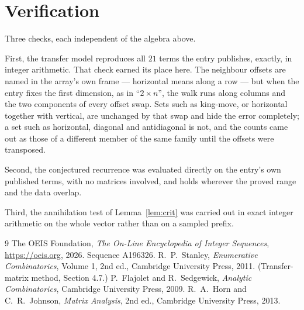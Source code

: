 \documentclass[11pt,a4paper]{article}
\theoremstyle{plain}
\theoremstyle{definition}
\begin{document}
\section{Verification}

Three checks, each independent of the algebra above.

First, the transfer model reproduces all $21$ terms the entry publishes, exactly, in
integer arithmetic. That check earned its place here. The neighbour offsets are named in the
array's own frame --- horizontal means along a row --- but when the entry fixes the first
dimension, as in ``$2\times n$'', the walk runs along columns and the two components of every
offset swap. Sets such as king-move, or horizontal together with vertical, are unchanged by
that swap and hide the error completely; a set such as horizontal, diagonal and antidiagonal
is not, and the counts came out as those of a different member of the same family until the
offsets were transposed.

Second, the conjectured recurrence was evaluated directly on the entry's own published terms,
with no matrices involved, and holds wherever the proved range and the data overlap.

Third, the annihilation test of Lemma~\ref{lem:crit} was carried out in exact integer
arithmetic on the whole vector rather than on a sampled prefix.

\begin{thebibliography}{9}
 The OEIS Foundation, \emph{The On-Line Encyclopedia of Integer
Sequences}, \url{https://oeis.org}, 2026. Sequence A196326.
 R.~P.~Stanley, \emph{Enumerative Combinatorics}, Volume 1, 2nd ed.,
Cambridge University Press, 2011. (Transfer-matrix method, Section 4.7.)
 P.~Flajolet and R.~Sedgewick, \emph{Analytic Combinatorics}, Cambridge
University Press, 2009.
 R.~A.~Horn and C.~R.~Johnson, \emph{Matrix Analysis}, 2nd ed., Cambridge
University Press, 2013.
\end{thebibliography}
\end{document}
